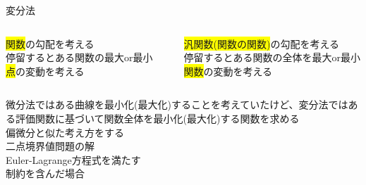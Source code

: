\documentclass[dvipdfmx,12pt]{beamer}
\begin{document}
    \begin{frame}{変分法}
        \scriptsize

        \begin{columns}
            \begin{column}{.4\textwidth}
                \begin{tcolorbox}[title=微分法]
                    \colorbox{yellow}{関数}の勾配を考える\\
                    停留するとある関数の最大or最小 \\
                    \colorbox{yellow}{点}の変動を考える\\
                \end{tcolorbox}
            \end{column}
            \begin{column}{.2\textwidth}
            \end{column}
            \begin{column}{.4\textwidth}
                \begin{tcolorbox}[title=変分法]
                    \colorbox{yellow}{汎関数(関数の関数)}の勾配を考える\\
                    停留するとある関数の全体を最大or最小\\ 
                    \colorbox{yellow}{関数}の変動を考える\\
                \end{tcolorbox}
            \end{column}
        \end{columns}

        微分法ではある曲線を最小化(最大化)することを考えていたけど、変分法ではある評価関数に基づいて関数全体を最小化(最大化)する関数を求める \\
        
        偏微分と似た考え方をする \\

        二点境界値問題の解 \\
        Euler-Lagrange方程式を満たす \\
        制約を含んだ場合 \\
    \end{frame}
\end{document}
